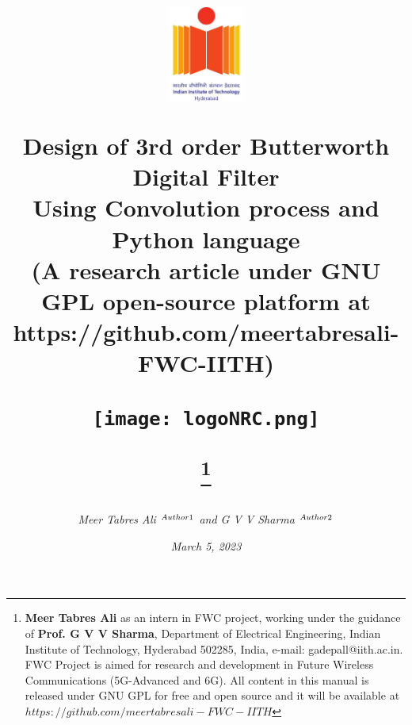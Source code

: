 \documentclass[journal,10pt,twocolumn]{article}
\begin{document}

\let\vec\mathbf


\title{
{\begin{minipage}{0.13\linewidth}
\includegraphics[width=2.5cm]{logoIITH.png}
\end{minipage}\hfill 
\begin{minipage}{0.7\linewidth}
\centering \Large \bfseries 
Design of 3rd order Butterworth Digital Filter\\
Using Convolution process and Python language \\
\vskip5mm
{\small (A research article under GNU GPL open-source platform at https://github.com/meertabresali-FWC-IITH)}
\end{minipage}\hfill 
\begin{minipage}{0.13\linewidth}
\texttt{[image: logoNRC.png]}
\end{minipage}\hfill }


\thanks{\textbf{Meer Tabres Ali} as an intern in FWC project, working under the guidance of \textbf{Prof. G V V Sharma}, Department of Electrical Engineering, Indian Institute of Technology, Hyderabad 502285, India, e-mail: gadepall@iith.ac.in. FWC Project is aimed for research and development in Future Wireless Communications (5G-Advanced and 6G). All content in this manual is released under GNU GPL for free and open source and it will be available at $https://github.com/meertabresali-FWC-IITH$}}

\author{\textit{Meer Tabres Ali $^{\small Author1}$ and G V V Sharma $^{\small Author2}$}} 
\date{\textit{March 5, 2023}}

\maketitle
\tableofcontents

\vspace{5cm}
\end{document}
